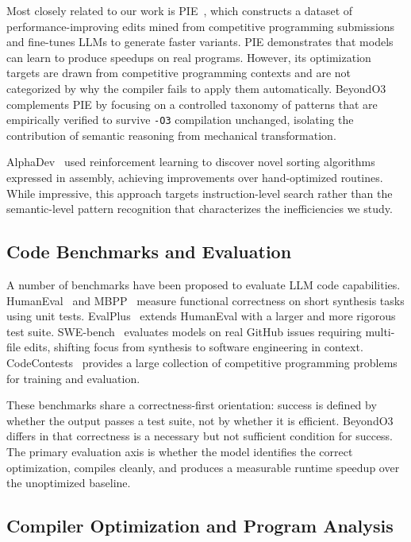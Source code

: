 Most closely related to our work is PIE~\cite{shypula2023pie}, which constructs a dataset of performance-improving edits mined from competitive programming submissions and fine-tunes LLMs to generate faster variants. PIE demonstrates that models can learn to produce speedups on real programs. However, its optimization targets are drawn from competitive programming contexts and are not categorized by why the compiler fails to apply them automatically. BeyondO3 complements PIE by focusing on a controlled taxonomy of patterns that are empirically verified to survive \texttt{-O3} compilation unchanged, isolating the contribution of semantic reasoning from mechanical transformation.

AlphaDev~\cite{mankowitz2023alphadev} used reinforcement learning to discover novel sorting algorithms expressed in assembly, achieving improvements over hand-optimized routines. While impressive, this approach targets instruction-level search rather than the semantic-level pattern recognition that characterizes the inefficiencies we study.

\subsection{Code Benchmarks and Evaluation}

A number of benchmarks have been proposed to evaluate LLM code capabilities. HumanEval~\cite{chen2021codex} and MBPP~\cite{austin2021mbpp} measure functional correctness on short synthesis tasks using unit tests. EvalPlus~\cite{liu2023evalplus} extends HumanEval with a larger and more rigorous test suite. SWE-bench~\cite{jimenez2024swebench} evaluates models on real GitHub issues requiring multi-file edits, shifting focus from synthesis to software engineering in context. CodeContests~\cite{li2022alphacode} provides a large collection of competitive programming problems for training and evaluation.

These benchmarks share a correctness-first orientation: success is defined by whether the output passes a test suite, not by whether it is efficient. BeyondO3 differs in that correctness is a necessary but not sufficient condition for success. The primary evaluation axis is whether the model identifies the correct optimization, compiles cleanly, and produces a measurable runtime speedup over the unoptimized baseline.

\subsection{Compiler Optimization and Program Analysis}

